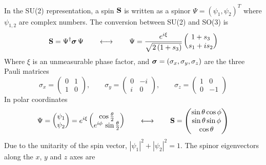 In the SU(2) representation, a spin ${\bf S}$ is written as a spinor $\Psi = \left( \psi_{1}, \psi_{2}
\right)^{T}$ where $\psi_{1,2}$ are complex numbers. The conversion between SU(2) and SO(3) is
\begin{equation}  
  {\bf S} = \Psi^{\dagger} {\bf \boldsymbol{\sigma}} \, \Psi 
  \qquad \longleftrightarrow \qquad
  \Psi  = \frac{e^{i \xi}}{\sqrt{2 \left(1+s_{3}\right)}}   
     \begin{pmatrix} 1+s_{3} \\ s_{1}+i s_{2} \end{pmatrix}   
\end{equation}  
Where $\xi$ is an unmeasurable phase factor, and ${\boldsymbol{\sigma}} = (\sigma_x, \sigma_y, \sigma_z)$ are
the three Pauli matrices
\begin{equation}
  \sigma_x = \begin{pmatrix} 0 &  1 \\ 1 &  0 \end{pmatrix}, \qquad
  \sigma_y = \begin{pmatrix} 0 & -i \\ i &  0 \end{pmatrix}, \qquad
  \sigma_z = \begin{pmatrix} 1 &  0 \\ 0 & -1 \end{pmatrix}
\end{equation}
In polar coordinates
\begin{equation}   
  \Psi = \begin{pmatrix} \psi_{1} \\ \psi_{2} \end{pmatrix}
       = e^{i \xi}
         \begin{pmatrix} 
            \cos \frac{\theta}{2} \\   
            e^{i \phi} \, \sin \frac{\theta}{2}
         \end{pmatrix}
  \qquad \longleftrightarrow \qquad
  {\bf S} = \begin{pmatrix} \sin \theta \cos \phi \\   
                          \sin \theta \sin \phi \\   
                          \cos \theta \end{pmatrix}
  \label{pp1p2}
\end{equation}
Due to the unitarity of the spin vector,   
$|\psi_{1}|^{2} + |\psi_{2}|^{2} = 1$.
The spinor eigenvectors along the $x$, $y$ and $z$ axes are
